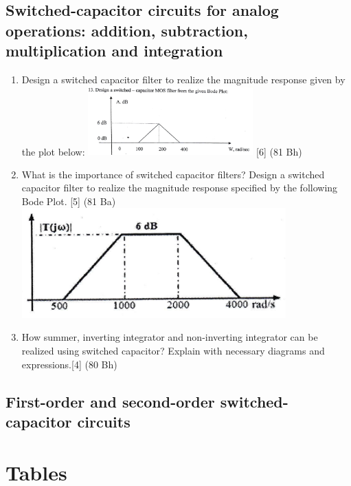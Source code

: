 \documentclass[12pt]{article}
\begin{document}
\subsection{Switched-capacitor circuits for analog operations: addition, subtraction, multiplication and integration}
\begin{enumerate}
\item Design a switched capacitor filter to realize the magnitude response given by the plot below:
\includegraphics[width=0.5\textwidth]{fd_1} \hfill [6] (81 Bh)

	\item What is the importance of switched capacitor filters? Design a switched capacitor filter to realize the magnitude response specified by the following Bode Plot. \hfill [5] (81 Ba)\\
	\includegraphics[width=4in]{fd_12}

\item How summer, inverting integrator and non-inverting integrator can be realized using switched capacitor? Explain with necessary diagrams and expressions.\hfill [4] (80 Bh)
\end{enumerate}
\subsection{First-order and second-order switched-capacitor circuits}

\pagebreak
\section{Tables}
\label{sec:tables_81bh}
\end{document}
